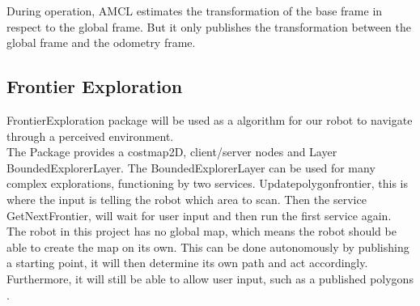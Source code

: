  During operation, AMCL estimates the transformation of the base frame in respect to the global frame. But it only publishes the transformation between the global frame and the odometry frame\cite{AMCL}.





\subsection{Frontier Exploration}

FrontierExploration package will be used as a algorithm for our robot to navigate through a perceived environment.\\
The Package provides a costmap2D, client/server nodes and Layer BoundedExplorerLayer. The BoundedExplorerLayer can be used for many complex explorations, functioning by two services. Updatepolygonfrontier, this is where the input is telling the robot which area to scan. Then the service GetNextFrontier, will wait for user input and then run the first service again.\\
The robot in this project has no global map, which means the robot should be able to create the map on its own. This can be done autonomously by publishing a starting point, it will then determine its own path and act accordingly. Furthermore, it will still be able to allow user input, such as a published polygons \cite{ROSexploration}.
\newpage

